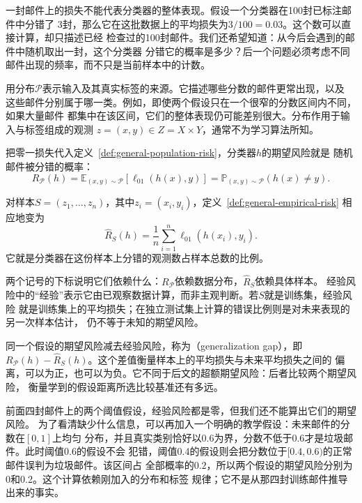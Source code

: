 一封邮件上的损失不能代表分类器的整体表现。假设一个分类器在100封已标注邮件中分错了
3封，那么它在这批数据上的平均损失为$3/100=0.03$。这个数可以直接计算，却只描述已经
检查过的100封邮件。我们还希望知道：从今后会遇到的邮件中随机取出一封，这个分类器
分错它的概率是多少？后一个问题必须考虑不同邮件出现的频率，而不只是当前样本中的计数。

用分布$\mathcal P$表示输入及其真实标签的来源。它描述哪些分数的邮件更常出现，以及
这些邮件分别属于哪一类。例如，即使两个假设只在一个很窄的分数区间内不同，如果大量邮件
都集中在该区间，它们的整体表现仍可能差别很大。分布作用于输入与标签组成的观测
$z=(x,y)\in Z=X\times Y$，通常不为学习算法所知。

把零一损失代入定义~\ref{def:general-population-risk}，分类器$h$的期望风险就是
随机邮件被分错的概率：
\begin{equation}
 R_{\mathcal P}(h)
 =\mathbb E_{(x,y)\sim\mathcal P}[\ell_{01}(h(x),y)]
 =\mathbb P_{(x,y)\sim\mathcal P}(h(x)\neq y).
 \label{eq:population-classification-risk}
\end{equation}

对样本$S=(z_1,\ldots,z_n)$，其中$z_i=(x_i,y_i)$，定义~\ref{def:general-empirical-risk}
相应地变为
\begin{equation}
 \hat R_S(h)=\frac1n\sum_{i=1}^n\ell_{01}(h(x_i),y_i).
 \label{eq:empirical-classification-risk}
\end{equation}
它就是分类器在这份样本上分错的观测数占样本总数的比例。

两个记号的下标说明它们依赖什么：$R_{\mathcal P}$依赖数据分布，$\hat R_S$依赖具体样本。
经验风险中的“经验”表示它由已观察数据计算，而非主观判断。若$S$就是训练集，经验风险
就是训练集上的平均损失；在独立测试集上计算的错误比例则是对未来表现的另一次样本估计，
仍不等于未知的期望风险。

同一个假设的期望风险减去经验风险，称为（generalization gap），即
$R_{\mathcal P}(h)-\hat R_S(h)$。这个差值衡量样本上的平均损失与未来平均损失之间的
偏离，可以为正，也可以为负。它不同于后文的超额期望风险：后者比较两个期望风险，
衡量学到的假设距离所选比较基准还有多远。

前面四封邮件上的两个阈值假设，经验风险都是零，但我们还不能算出它们的期望风险。
为了看清缺少什么信息，可以再加入一个明确的教学假设：未来邮件的分数在$[0,1]$上均匀
分布，并且真实类别恰好以0.6为界，分数不低于0.6才是垃圾邮件。此时阈值0.6的假设不会
犯错，阈值0.4的假设则会把分数位于$[0.4,0.6)$的正常邮件误判为垃圾邮件。该区间占
全部概率的$0.2$，所以两个假设的期望风险分别为0和0.2。这个计算依赖刚加入的分布和标签
规律；它不是从那四封训练邮件推导出来的事实。


